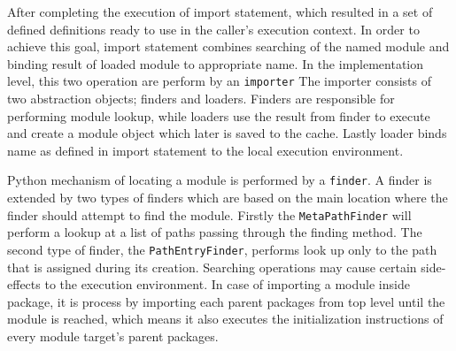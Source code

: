 After completing the execution of import statement, which resulted in a set of defined definitions ready to use in the caller’s execution context.
In order to achieve this goal, import statement combines searching of the named module and binding result of loaded module to appropriate name.
In the implementation level, this two operation are perform by an \texttt{importer} The importer consists of two abstraction objects; finders and loaders.
Finders are responsible for performing module lookup, while loaders use the result from finder to execute and create a module object which later is saved to the cache.
Lastly loader binds name as defined in import statement to the local execution environment.

Python mechanism of locating a module is performed by a \texttt{finder}.
A finder is extended by two types of finders which are based on the main location where the finder should attempt to find the module.
Firstly the \texttt{MetaPathFinder} will perform a lookup at a list of paths passing through the finding method.
The second type of finder, the \texttt{PathEntryFinder}, performs look up only to the path that is assigned during its creation.
Searching operations may cause certain side-effects to the execution environment. In case of importing a module inside package, it is process by importing each parent packages from top level until the module is reached, which means it also executes the initialization instructions of every module target's parent packages.